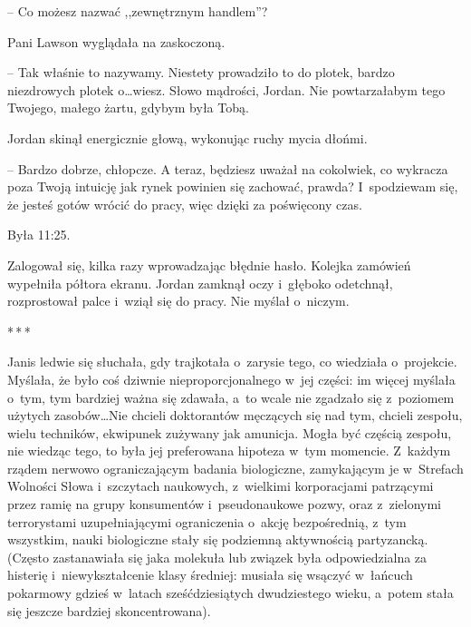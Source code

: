 \documentclass[oneside,polish,11pt,sfheadings]{mwbk}
\newcommand{\threeast}{\bigskip\par\centerline{*\,*\,*}\medskip\par}%
\begin{document}
-- Co możesz nazwać ,,zewnętrznym handlem''?

Pani Lawson wyglądała na zaskoczoną.

-- Tak właśnie to nazywamy. Niestety prowadziło to do plotek, bardzo
niezdrowych plotek o\ldots wiesz. Słowo mądrości, Jordan. Nie powtarzałabym
tego Twojego, małego żartu, gdybym była Tobą.

Jordan skinął energicznie głową, wykonując ruchy mycia dłońmi.

-- Bardzo dobrze, chłopcze. A teraz, będziesz uważał na cokolwiek, co
wykracza poza Twoją intuicję jak rynek powinien się zachować, prawda? I~spodziewam się, że jesteś gotów wrócić do pracy, więc dzięki za
poświęcony czas.

Była 11:25.

Zalogował się, kilka razy wprowadzając błędnie hasło. Kolejka zamówień
wypełniła półtora ekranu. Jordan zamknął oczy i~głęboko odetchnął,
rozprostował palce i~wziął się do pracy. Nie myślał o~niczym.
  \threeast 

Janis ledwie się słuchała, gdy trajkotała o~zarysie tego, co wiedziała o~projekcie. Myślała, że było coś dziwnie nieproporcjonalnego w~jej
części: im więcej myślała o~tym, tym bardziej ważna się zdawała, a~to
wcale nie zgadzało się z~poziomem użytych zasobów\ldots Nie chcieli
doktorantów męczących się nad tym, chcieli zespołu, wielu techników,
ekwipunek zużywany jak amunicja. Mogła być częścią zespołu, nie wiedząc
tego, to była jej preferowana hipoteza w~tym momencie. Z~każdym rządem
nerwowo ograniczającym badania biologiczne, zamykającym je w~Strefach
Wolności Słowa i~szczytach naukowych, z~wielkimi korporacjami patrzącymi
przez ramię na grupy konsumentów i~pseudonaukowe pozwy, oraz z~zielonymi
terrorystami uzupełniającymi ograniczenia o~akcję bezpośrednią, z~tym
wszystkim, nauki biologiczne stały się podziemną aktywnością
partyzancką. (Często zastanawiała się jaka molekuła lub związek była
odpowiedzialna za histerię i~niewykształcenie klasy średniej: musiała
się wsączyć w~łańcuch pokarmowy gdzieś w~latach sześćdziesiątych
dwudziestego wieku, a~potem stała się jeszcze bardziej skoncentrowana).
\end{document}
